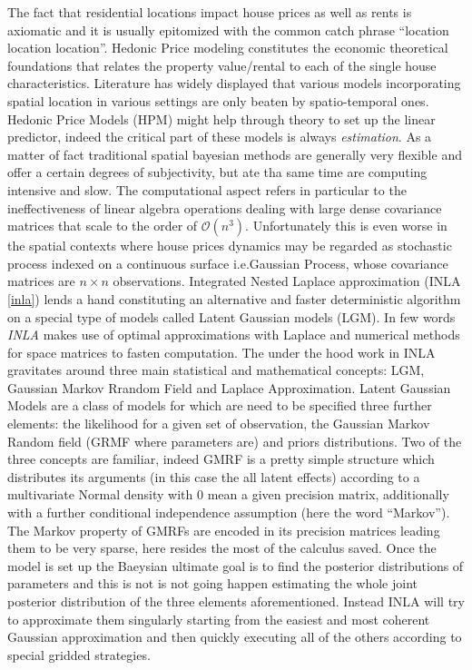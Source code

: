 \documentclass[
  12pt,
  a4paper,
  oneside]{book}
\theoremstyle{definition}
\theoremstyle{definition}
\theoremstyle{definition}
\theoremstyle{remark}
\begin{document}
The fact that residential locations impact house prices as well as rents is axiomatic and it is usually epitomized with the common catch phrase ``location location location''. Hedonic Price modeling constitutes the economic theoretical foundations that relates the property value/rental to each of the single house characteristics. Literature has widely displayed that various models incorporating spatial location in various settings are only beaten by spatio-temporal ones.
Hedonic Price Models (HPM) might help through theory to set up the linear predictor, indeed the critical part of these models is always \emph{estimation}.
As a matter of fact traditional spatial bayesian methods are generally very flexible and offer a certain degrees of subjectivity, but ate tha same time are computing intensive and slow. The computational aspect refers in particular to the ineffectiveness of linear algebra operations dealing with large dense covariance matrices that scale to the order of \(\mathcal{O}(n^3)\). Unfortunately this is even worse in the spatial contexts where house prices dynamics may be regarded as stochastic process indexed on a continuous surface i.e.Gaussian Process, whose covariance matrices are \(n \times n\) observations.
Integrated Nested Laplace approximation (INLA \ref{inla}) lends a hand constituting an alternative and faster deterministic algorithm on a special type of models called Latent Gaussian models (LGM). In few words \emph{INLA} makes use of optimal approximations with Laplace and numerical methods for space matrices to fasten computation. The under the hood work in INLA gravitates around three main statistical and mathematical concepts: LGM, Gaussian Markov Rrandom Field and Laplace Approximation. Latent Gaussian Models are a class of models for which are need to be specified three further elements: the likelihood for a given set of observation, the Gaussian Markov Random field (GRMF where parameters are) and priors distributions. Two of the three concepts are familiar, indeed GMRF is a pretty simple structure which distributes its arguments (in this case the all latent effects) according to a multivariate Normal density with 0 mean a given precision matrix, additionally with a further conditional independence assumption (here the word ``Markov''). The Markov property of GMRFs are encoded in its precision matrices leading them to be very sparse, here resides the most of the calculus saved. Once the model is set up the Baeysian ultimate goal is to find the posterior distributions of parameters and this is not is not going happen estimating the whole joint posterior distribution of the three elements aforementioned. Instead INLA will try to approximate them singularly starting from the easiest and most coherent Gaussian approximation and then quickly executing all of the others according to special gridded strategies.
\end{document}

